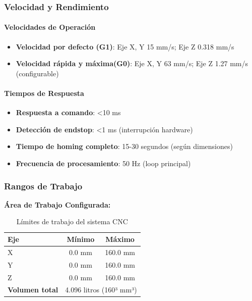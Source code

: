 \documentclass[12pt]{article}
\begin{document}
\subsubsection{Velocidad y Rendimiento}

\paragraph{Velocidades de Operación}
\begin{itemize}
    \item \textbf{Velocidad por defecto (G1)}: Eje X, Y 15 mm/s; Eje Z 0.318 mm/s
    \item \textbf{Velocidad rápida y máxima(G0)}: Eje X, Y 63 mm/s; Eje Z 1.27 mm/s (configurable)
\end{itemize}

\paragraph{Tiempos de Respuesta}
\begin{itemize}
    \item \textbf{Respuesta a comando}: <10 ms
    \item \textbf{Detección de endstop}: <1 ms (interrupción hardware)
    \item \textbf{Tiempo de homing completo}: 15-30 segundos (según dimensiones)
    \item \textbf{Frecuencia de procesamiento}: 50 Hz (loop principal)
\end{itemize}

\subsubsection{Rangos de Trabajo}

\textbf{Área de Trabajo Configurada:}
\begin{table}[h]
\centering
\begin{tabular}{|l|c|c|}
\hline
\textbf{Eje} & \textbf{Mínimo} & \textbf{Máximo} \\
\hline
X & 0.0 mm & 160.0 mm \\
Y & 0.0 mm & 160.0 mm \\
Z & 0.0 mm & 160.0 mm \\
\hline
\textbf{Volumen total} & \multicolumn{2}{c|}{4.096 litros (160³ mm³)} \\
\hline
\end{tabular}
\caption{Límites de trabajo del sistema CNC}
\end{table}
\end{document}
